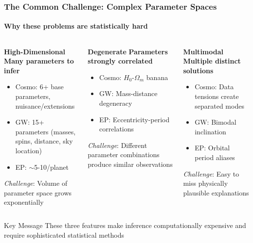 \documentclass[aspectratio=169]{beamer}
\newcommand{\keyterm}[1]{\textbf{\textcolor{C0}{#1}}}
\begin{document}
\begin{frame}
    \frametitle{The Common Challenge: Complex Parameter Spaces}
    \framesubtitle{Why these problems are statistically hard}
    \begin{columns}[T]
        \begin{block}{\keyterm{High-Dimensional}}
            \textbf{Many parameters to infer}
            \begin{itemize}
                \item Cosmo: 6+ base parameters, nuisance/extensions
                \item GW: 15+ parameters (masses, spins, distance, sky location)
                \item EP: $\sim$5-10/planet
            \end{itemize}
            \vspace{5pt}
            \textit{Challenge}: Volume of parameter space grows exponentially
        \end{block}
        \begin{block}{\keyterm{Degenerate}}
            \textbf{Parameters strongly correlated}
            \begin{itemize}
                \item Cosmo: $H_0$-$\Omega_m$ banana
                \item GW: Mass-distance degeneracy
                \item EP: Eccentricity-period correlations
            \end{itemize}
            \vspace{5pt}
            \textit{Challenge}: Different parameter combinations produce similar observations
        \end{block}
        \begin{block}{\keyterm{Multimodal}}
            \textbf{Multiple distinct solutions}
            \begin{itemize}
                \item Cosmo: Data tensions create separated modes
                \item GW: Bimodal inclination
                \item EP: Orbital period aliases
            \end{itemize}
            \vspace{5pt}
            \textit{Challenge}: Easy to miss physically plausible explanations
        \end{block}
    \end{columns}
    \vspace{10pt}
    \begin{alertblock}{Key Message}
        These three features make inference computationally expensive and require sophisticated statistical methods
    \end{alertblock}
\end{frame}
\end{document}
